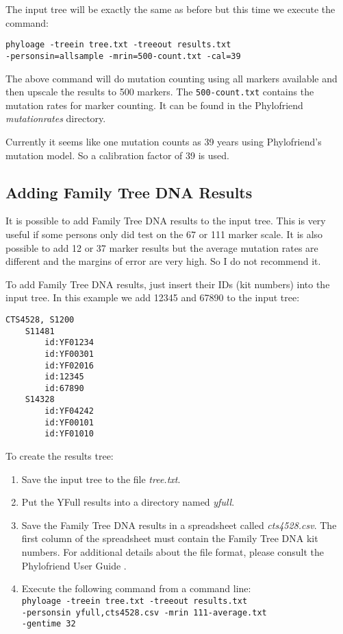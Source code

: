 The input tree will be exactly the same as before but this time
we execute the command:

\vspace{1ex}\noindent
\texttt{phyloage -treein tree.txt -treeout results.txt\\
-personsin=allsample -mrin=500-count.txt -cal=39 }
\vspace{1ex}

\noindent The above command will do mutation counting using
all markers available and then upscale the results to 500
markers. The \texttt{500-count.txt} contains the mutation rates
for marker counting. It can be found in the Phylofriend
\cite{Phylofriend} \emph{mutationrates} directory.

Currently it seems like one mutation counts as 39 years
using Phylofriend's mutation model. So a calibration factor
of 39 is used.


\subsection{Adding Family Tree DNA Results}

It is possible to add Family Tree DNA results to the input
tree. This is very useful if some persons only did test on
the 67 or 111 marker scale. It is also possible to add 12 or
37 marker results but the average mutation rates are different
and the margins of error are very high. So I do not recommend
it.

To add Family Tree DNA results, just insert their IDs
(kit numbers) into the input tree. In this example we add
12345 and 67890 to the input tree:

\begin{verbatim}
CTS4528, S1200
    S11481
        id:YF01234
        id:YF00301
        id:YF02016
        id:12345
        id:67890
    S14328
        id:YF04242
        id:YF00101
        id:YF01010
\end{verbatim}

To create the results tree:

\begin{enumerate}
\item Save the input tree to the file \emph{tree.txt}.
\item Put the YFull results into a directory named
	\emph{yfull}.
\item Save the Family Tree DNA results in a spreadsheet
	called \emph{cts4528.csv}. The first column of the 
	spreadsheet must contain the Family Tree DNA kit numbers.
	For additional details about the file format, please
	consult the Phylofriend User Guide \cite{PhylofriendUserGuide}.
\item Execute the following command from a command line:\\
	\texttt{phyloage -treein tree.txt -treeout results.txt\\
	-personsin yfull,cts4528.csv -mrin 111-average.txt\\
	-gentime 32}
\end{enumerate}

